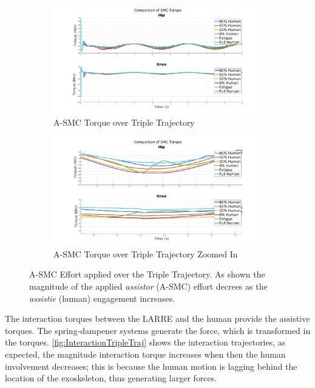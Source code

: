 \begin{figure}
    \begin{subfigure}{\linewidth}
        \centering
        \includegraphics[width=\columnwidth]{images/controllers/trajs/SMC_full.png}
        \caption[A-SMC Torque over Triple Trajectory]{A-SMC Torque over Triple Trajectory}
        \label{fig:SMCTripleFull}
    \end{subfigure}
    \begin{subfigure}{\linewidth}
        \centering
        \includegraphics[width=\columnwidth]{images/controllers/trajs/SMC_zoom.png}
        \caption[A-SMC Torque over Triple Trajectory Zoomed]{A-SMC Torque over Triple Trajectory Zoomed In}
        \label{fig:SMCTripleZoom}
    \end{subfigure}
    \caption[A-SMC Effort applied over the Triple Trajectory]{A-SMC Effort applied over the Triple Trajectory. As shown the magnitude of the applied \textit{assistor} (A-SMC) effort decrees as the \textit{assistie} (human) engagement increases. }
    \label{fig:SMCEffortTriple}
\end{figure}

The interaction torques between the LARRE and the human provide the assistive torques. The spring-dampener systems generate the force, which is transformed in the torques. \autoref{fig:InteractionTripleTraj} shows the interaction trajectories, as expected, the magnitude interaction torque increases when then the human involvement decreases; this is because the human motion is lagging behind the location of the exoskeleton, thus generating larger forces. 

